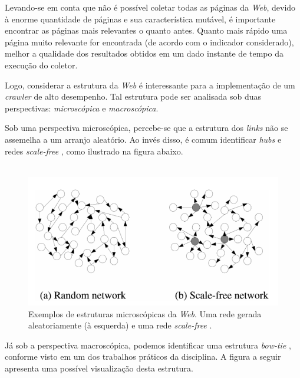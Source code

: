 \documentclass[a4paper,12pt,titlepage]{article}
\begin{document}
Levando-se em conta que não é possível coletar todas as páginas da \textit{Web}, devido à enorme quantidade de páginas e sua característica mutável, é importante encontrar as páginas mais relevantes o quanto antes. Quanto mais rápido uma página muito relevante for encontrada (de acordo com o indicador considerado), melhor a qualidade dos resultados obtidos em um dado instante de tempo da execução do coletor.

Logo, considerar a estrutura da \textit{Web} é interessante para a implementação de um \textit{crawler} de alto desempenho. Tal estrutura pode ser analisada sob duas perspectivas: \textit{microscópica} e \textit{macroscópica}.

Sob uma perspectiva microscópica, percebe-se que a estrutura dos \textit{links} não se assemelha a um arranjo aleatório. Ao invés disso, é comum identificar \textit{hubs} e redes \textit{scale-free} {\cite{barabasi}}, como ilustrado na figura abaixo.
\\ \ 

\begin{figure}[H]
     \centering
     \includegraphics[scale=0.5]{figures/network-types.png}
     \caption{Exemplos de estruturas microscópicas da \textit{Web}. Uma rede gerada aleatoriamente (à esquerda) e uma rede \textit{scale-free} \cite{barabasi}.}
     \label{bsp}
\end{figure}

Já sob a perspectiva macroscópica, podemos identificar uma estrutura \textit{bow-tie} {\cite{broder}}, conforme visto em um dos trabalhos práticos da disciplina. A figura a seguir apresenta uma possível visualização desta estrutura.
 
\end{document}
